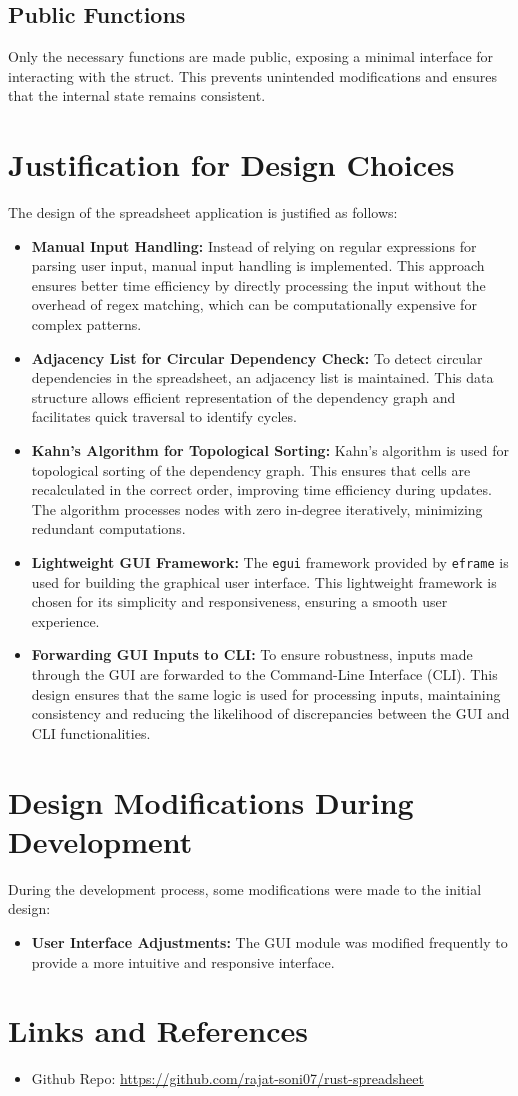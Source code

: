 \documentclass{article}
\begin{document}
\subsection{Public Functions}
Only the necessary functions are made public, exposing a minimal interface for interacting with the struct. This prevents unintended modifications and ensures that the internal state remains consistent.

\section{Justification for Design Choices}
The design of the spreadsheet application is justified as follows:
\begin{itemize}
    \item \textbf{Manual Input Handling:} Instead of relying on regular expressions for parsing user input, manual input handling is implemented. This approach ensures better time efficiency by directly processing the input without the overhead of regex matching, which can be computationally expensive for complex patterns.
    \item \textbf{Adjacency List for Circular Dependency Check:} To detect circular dependencies in the spreadsheet, an adjacency list is maintained. This data structure allows efficient representation of the dependency graph and facilitates quick traversal to identify cycles.
    \item \textbf{Kahn's Algorithm for Topological Sorting:} Kahn's algorithm is used for topological sorting of the dependency graph. This ensures that cells are recalculated in the correct order, improving time efficiency during updates. The algorithm processes nodes with zero in-degree iteratively, minimizing redundant computations.
    \item \textbf{Lightweight GUI Framework:} The \texttt{egui} framework provided by \texttt{eframe} is used for building the graphical user interface. This lightweight framework is chosen for its simplicity and responsiveness, ensuring a smooth user experience.
    \item \textbf{Forwarding GUI Inputs to CLI:} To ensure robustness, inputs made through the GUI are forwarded to the Command-Line Interface (CLI). This design ensures that the same logic is used for processing inputs, maintaining consistency and reducing the likelihood of discrepancies between the GUI and CLI functionalities.
\end{itemize}

\section{Design Modifications During Development}
During the development process, some modifications were made to the initial design:
\begin{itemize}
    \item \textbf{User Interface Adjustments:} The GUI module was modified frequently to provide a more intuitive and responsive interface.
\end{itemize}


\section{Links and References}
\begin{itemize}
    \item Github Repo: \url{https://github.com/rajat-soni07/rust-spreadsheet}
    
\end{itemize}
\end{document}
